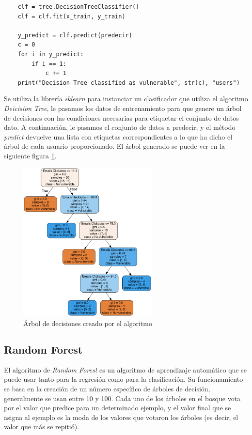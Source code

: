 \documentclass[12pt, a4paper,twoside,titlepage]{article}
\begin{document}
\begin{verbatim}
    clf = tree.DecisionTreeClassifier()
    clf = clf.fit(x_train, y_train)

    y_predict = clf.predict(predecir)
    c = 0
    for i in y_predict:
        if i == 1:
            c += 1
    print("Decision Tree classified as vulnerable", str(c), "users")
\end{verbatim}
Se utiliza la librería \emph{sklearn} para instanciar un clasificador que utiliza el algoritmo \emph{Deicision Tree}, le pasamos los datos de entrenamiento para que genere un árbol de decisiones con las condiciones necesarias para etiquetar el conjunto de datos dato.
A continuación, le pasamos el conjunto de datos a predecir, y el método \emph{predict} devuelve una lista con etiquetas correspondientes a lo que ha dicho el árbol de cada usuario proporcionado.
El árbol generado se puede ver en la siguiente figura \ref{fig:DecisionTree}.
\begin{figure}[H]
    \centering
    \includegraphics[width=70mm]{Figuras/decision_tree.png}
    \caption{Árbol de decisiones creado por el algoritmo}
    \label{fig:DecisionTree}
\end{figure}


\subsection{Random Forest}

El algoritmo de \emph{Random Forest} es un algoritmo de aprendizaje automático que se puede usar tanto para la regresión como para la clasificación. Su funcionamiento se basa en la creación de un número específico de árboles de decisión, generalmente se usan entre 10 y 100. Cada uno de los árboles en el bosque vota por el valor que predice para un determinado ejemplo, y el valor final que se asigna al ejemplo es la moda de los valores que votaron los árboles (es decir, el valor que más se repitió). 
\end{document}
